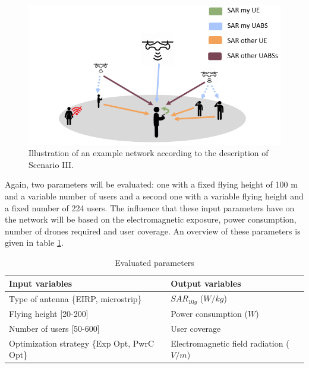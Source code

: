 \begin{figure}[H]
\centering
  \includegraphics[width=\textwidth/10*7]{../images/IllustrationS3.png}
  \caption{Illustration of an example network according to the description of Scenario III.}
  \label{fig:IllustrationS3}
\end{figure}

Again, two parameters will be evaluated: one with a fixed flying height of 100 m and a variable number of users and a second one with 
a variable flying height and a fixed number of 224 users.
The influence that these input parameters have on the network will be based on the electromagnetic exposure, power consumption, number of drones required and user coverage.
An overview of these parameters is given in table \ref{table:s3:evalpara}.

\begin{table}[!htb]
      \centering
            \begin{tabular}{|l|l|}
            \hline
            \textbf{Input variables  }                        & \textbf{Output variables}       \\   \hline 
            Type of antenna  \{EIRP, microstrip\}               & $SAR_{10g}$ ($W/kg$)                    \\ 
            Flying height    [20-200]                         & Power consumption ($W$)             \\ 
            Number of users  [50-600]                         & User coverage                   \\
            Optimization strategy \{Exp Opt, PwrC Opt\}         &   Electromagnetic field radiation ($V/m$)\\
            \hline
            \end{tabular}
                 \caption{Evaluated parameters}
          \label{table:s3:evalpara}
\end{table}


